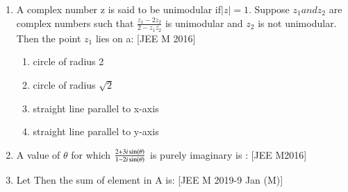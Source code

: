 \documentclass[journal,12pt,twocolumn,article]{IEEEtran}
\theoremstyle{remark}
\begin{document}
\begin{enumerate}[start = 14]
\begin{enumerate}
\end{enumerate}

\item A complex number z is said to be unimodular if$|z|=1$. Suppose $z_1 and z_2$ are complex numbers such that $\frac{z_1 -2z_2}{2-z_1\overline{z_2}}$ is unimodular and $z_2$ is not unimodular. Then the point $z_1$ lies on a:                                
\hfill{[JEE M 2016]}                               

\begin{enumerate}                                  
                              
\item \text circle of radius 2
                             
\item \text circle of radius $\sqrt2$ 

\item \text straight line parallel to x-axis 

\item \text  straight line parallel to y-axis

\end{enumerate}

\item A value of $\theta$ for which $\frac{2+3i\sin\left(\theta\right)}{1-2i\sin\left(\theta\right)}$ is purely imaginary is :      
\hfill{[JEE M2016]}

\begin{enumerate}
\end{enumerate}                                     

\item Let   Then the sum of element in A is:
\hfill{[JEE M 2019-9 Jan (M)]}
\begin{enumerate}
\end{enumerate}


\end{enumerate}
\end{document}
